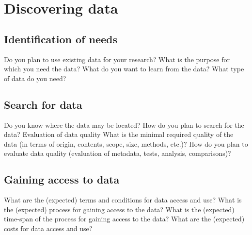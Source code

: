\documentclass[11pt,a4paper]{article}
\begin{document}
	\section{Discovering data}
	\subsection{Identification of needs}
	Do you plan to use existing data for your research?
	What is the purpose for which you need the data?
	What do you want to learn from the data?
	What type of data do you need?
	
	\subsection{Search for data}
	Do you know where the data may be located?
	How do you plan to search for the data?
	Evaluation of data quality
	What is the minimal required quality of the data (in terms of origin, contents, scope,
	size, methods, etc.)?
	How do you plan to evaluate data quality (evaluation of metadata, tests, analysis,
	comparisons)?
	
	\subsection{Gaining access to data}
	What are the (expected) terms and conditions for data access and use?
	What is the (expected) process for gaining access to the data?
	What is the (expected) time-span of the process for gaining access to the data?
	What are the (expected) costs for data access and use?
	
	
\end{document}
